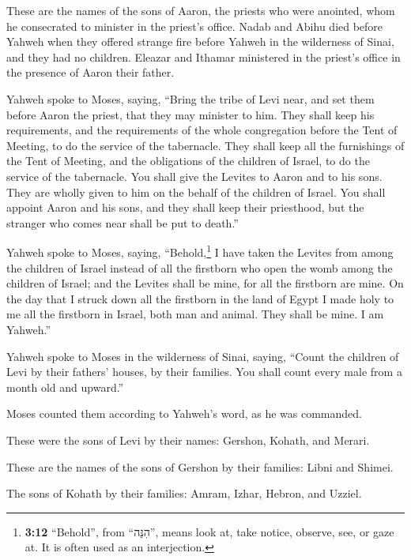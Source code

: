  These are the names of the sons of Aaron, the priests who
were anointed, whom he consecrated to minister in the priest's office.
 Nadab and Abihu died before Yahweh when they offered
strange fire before Yahweh in the wilderness of Sinai, and they had no
children. Eleazar and Ithamar ministered in the priest's office in the
presence of Aaron their father.

 Yahweh spoke to Moses, saying,  ``Bring the
tribe of Levi near, and set them before Aaron the priest, that they may
minister to him.  They shall keep his requirements, and
the requirements of the whole congregation before the Tent of Meeting,
to do the service of the tabernacle.  They shall keep all
the furnishings of the Tent of Meeting, and the obligations of the
children of Israel, to do the service of the tabernacle. 
You shall give the Levites to Aaron and to his sons. They are wholly
given to him on the behalf of the children of Israel. 
You shall appoint Aaron and his sons, and they shall keep their
priesthood, but the stranger who comes near shall be put to death.''

 Yahweh spoke to Moses, saying, 
``Behold,\footnote{\textbf{3:12} ``Behold'', from ``הִנֵּה'', means look
  at, take notice, observe, see, or gaze at. It is often used as an
  interjection.} I have taken the Levites from among the children of
Israel instead of all the firstborn who open the womb among the children
of Israel; and the Levites shall be mine,  for all the
firstborn are mine. On the day that I struck down all the firstborn in
the land of Egypt I made holy to me all the firstborn in Israel, both
man and animal. They shall be mine. I am Yahweh.''

 Yahweh spoke to Moses in the wilderness of Sinai,
saying,  ``Count the children of Levi by their fathers'
houses, by their families. You shall count every male from a month old
and upward.''

 Moses counted them according to Yahweh's word, as he was
commanded.

 These were the sons of Levi by their names: Gershon,
Kohath, and Merari.

 These are the names of the sons of Gershon by their
families: Libni and Shimei.

 The sons of Kohath by their families: Amram, Izhar,
Hebron, and Uzziel.

